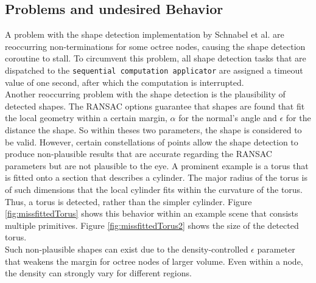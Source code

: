 \subsection{Problems and undesired Behavior}
\label{sec:shape_detection_problems}
A problem with the shape detection implementation by Schnabel et al. \cite{schnabel-2007-software} are reoccurring non-terminations for some octree nodes, causing the shape detection coroutine to stall. To circumvent this problem, all shape detection tasks that are dispatched to the \verb|sequential computation applicator| are assigned a timeout value of one second, after which the computation is interrupted. 
\\
Another reoccurring problem with the shape detection is the plausibility of detected shapes. The RANSAC options guarantee that shapes are found that fit the local geometry within a certain margin, $\alpha$ for the normal's angle and $\epsilon$ for the distance the shape. So within theses two parameters, the shape is considered to be valid. However, certain constellations of points allow the shape detection to produce non-plausible results that are accurate regarding the RANSAC parameters but are not plausible to the eye. A prominent example is a torus that is fitted onto a section that describes a cylinder. The major radius of the torus is of such dimensions that the local cylinder fits within the curvature of the torus. Thus, a torus is detected, rather than the simpler cylinder. Figure \ref{fig:missfittedTorus} shows this behavior within an example scene that consists multiple primitives. Figure \ref{fig:missfittedTorus2} shows the size of the detected torus. 
\\
Such non-plausible shapes can exist due to the density-controlled $\epsilon$ parameter that weakens the margin for octree nodes of larger volume. Even within a node, the density can strongly vary for different regions. 

